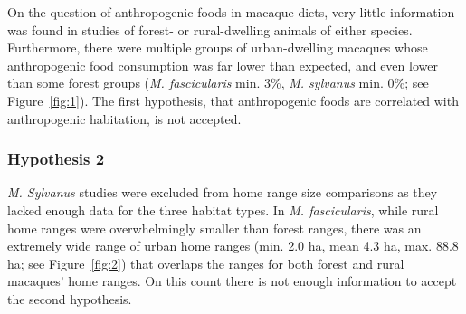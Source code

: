 \documentclass{../../../coursework}
\begin{document}
On the question of anthropogenic foods in macaque diets, very little
information was found in studies of forest- or rural-dwelling animals of
either species. Furthermore, there were multiple groups of urban-dwelling
macaques whose anthropogenic food consumption was far lower than expected, and
even lower than some forest groups (\textit{M. fascicularis} min. 3\%,
\textit{M. sylvanus} min. 0\%; see Figure~\ref{fig:1}). The first hypothesis,
that anthropogenic foods are correlated with anthropogenic habitation, is not
accepted.

\subsubsection{Hypothesis 2}

\textit{M. Sylvanus} studies were excluded from home range size comparisons as
they lacked enough data for the three habitat types. In
\textit{M. fascicularis}, while rural home ranges were overwhelmingly smaller
than forest ranges, there was an extremely wide range of urban home ranges
(min. 2.0 ha, mean 4.3 ha, max. 88.8 ha; see Figure~\ref{fig:2}) that overlaps
the ranges for both forest and rural macaques' home ranges. On this count
there is not enough information to accept the second hypothesis.
\end{document}
